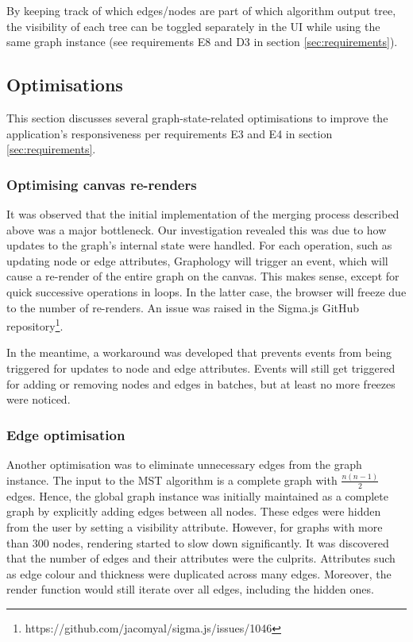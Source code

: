 \documentclass{l4proj}
\begin{document}
By keeping track of which edges/nodes are part of which algorithm output tree, the visibility of each tree can be toggled separately in the UI while using the same graph instance (see requirements E8 and D3 in section \ref{sec:requirements}).

\subsection{Optimisations}
This section discusses several graph-state-related optimisations to improve the application's responsiveness per requirements E3 and E4 in section \ref{sec:requirements}.

\subsubsection{Optimising canvas re-renders}
It was observed that the initial implementation of the merging process described above was a major bottleneck. Our investigation revealed this was due to how updates to the graph's internal state were handled.
For each operation, such as updating node or edge attributes, Graphology will trigger an event, which will cause a re-render of the entire graph on the canvas. This makes sense, except for quick successive operations in loops. In the latter case, the browser will freeze due to the number of re-renders. An issue was raised in the Sigma.js GitHub repository\footnote{https://github.com/jacomyal/sigma.js/issues/1046}.

In the meantime, a workaround was developed that prevents events from being triggered for updates to node and edge attributes. Events will still get triggered for adding or removing nodes and edges in batches, but at least no more freezes were noticed.

\subsubsection{Edge optimisation}
Another optimisation was to eliminate unnecessary edges from the graph instance. The input to the MST algorithm is a complete graph with $\frac{n(n-1)}{2}$ edges.
Hence, the global graph instance was initially maintained as a complete graph by explicitly adding edges between all nodes. These edges were hidden from the user by setting a visibility attribute.
However, for graphs with more than 300 nodes, rendering started to slow down significantly. It was discovered that the number of edges and their attributes were the culprits. Attributes such as edge colour and thickness were duplicated across many edges. Moreover, the render function would still iterate over all edges, including the hidden ones.
\end{document}
